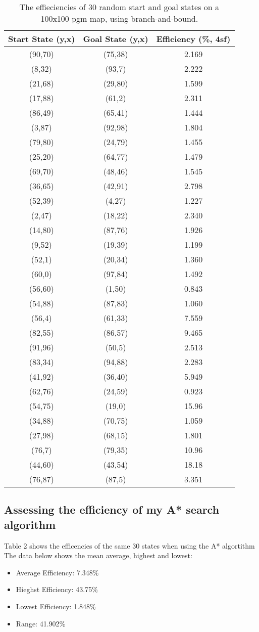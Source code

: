 \documentclass[11pt,oneside]{article}
\begin{document}
\begin{table}[ht]
    \centering
    \begin{tabular}{|c|c|c|}
	Start State (y,x)&Goal State (y,x)&Efficiency (\%, 4sf) \\ \hline
	(90,70)&(75,38)&2.169 \\
	(8,32)	&(93,7)&2.222 \\
	(21,68)&(29,80)&1.599 \\
	(17,88)&(61,2)&2.311 \\
	(86,49)&(65,41)&1.444 \\
	(3,87)&(92,98)&1.804 \\
	(79,80)&(24,79)&1.455 \\
	(25,20)&(64,77)&1.479 \\
	(69,70)&(48,46)&1.545 \\
	(36,65)&(42,91)&2.798 \\
	(52,39)&(4,27)&1.227 \\
	(2,47)&(18,22)&2.340 \\
	(14,80)&(87,76)&1.926 \\
	(9,52)&(19,39)&1.199 \\
	(52,1)&(20,34)&1.360 \\
	(60,0)&(97,84)&1.492 \\
	(56,60)&(1,50)&0.843 \\
	(54,88)&(87,83)&1.060 \\
	(56,4)&(61,33)&7.559 \\
	(82,55)&(86,57)&9.465 \\
	(91,96)&(50,5)&2.513 \\
	(83,34)&(94,88)&2.283 \\
	(41,92)&(36,40)&5.949 \\
	(62,76)&(24,59)&0.923 \\
	(54,75)&(19,0)&15.96 \\
	(34,88)&(70,75)&1.059 \\
	(27,98)&(68,15)&1.801 \\
	(76,7)&(79,35)&10.96 \\
	(44,60)&(43,54)&18.18 \\
	(76,87)&(87,5)&3.351 \\

    \end{tabular}
    \caption{The effieciencies of 30 random start and goal states on a 100x100 pgm map, using branch-and-bound.}
    \label{tab:bandbeff}
\end{table}


\subsection{Assessing the efficiency of my A* search algorithm}
Table 2 shows the efficencies of the same 30 states when using the A* algortithm The data below shows the mean average, highest and lowest:
\begin{itemize}
	\item Average Efficiency:	7.348\%
	\item Hieghst Efficiency:		43.75\%
	\item Lowest Efficiency:		1.848\%
	\item Range:				41.902\%
\end{itemize}
\end{document}
